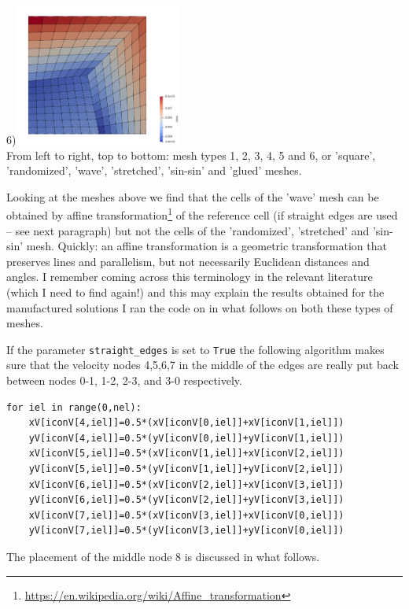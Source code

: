 \begin{center}
{\small 6})\includegraphics[width=5.5cm]{python_codes/fieldstone_76/results/mt6}\\
{\captionfont From left to right, top to bottom: mesh types 1, 2, 3, 4, 5 and 6, 
or 'square', 'randomized', 'wave', 'stretched', 'sin-sin' and 'glued' meshes.}
\end{center}

Looking at the meshes above we find that the cells of the 'wave' mesh 
can be obtained by affine transformation\footnote{\url{https://en.wikipedia.org/wiki/Affine_transformation}} 
of the reference cell (if straight edges are used -- see next paragraph) 
but not the cells of the 'randomized', 'stretched' and 'sin-sin' mesh. 
Quickly: an affine transformation 
is a geometric transformation that preserves lines and parallelism, but not necessarily 
Euclidean distances and angles. 
I remember coming across this terminology in the relevant literature (which I need to find again!)
and this may explain the results obtained for the manufactured solutions I ran the code on 
in what follows on both these types of meshes.

If the parameter \lstinline{straight_edges} is set to \lstinline{True}
the following algorithm makes sure that the velocity nodes 4,5,6,7 in the middle of the edges 
are really put back between nodes 0-1, 1-2, 2-3, and 3-0 respectively. 
\begin{lstlisting}
for iel in range(0,nel):
    xV[iconV[4,iel]]=0.5*(xV[iconV[0,iel]]+xV[iconV[1,iel]])
    yV[iconV[4,iel]]=0.5*(yV[iconV[0,iel]]+yV[iconV[1,iel]])
    xV[iconV[5,iel]]=0.5*(xV[iconV[1,iel]]+xV[iconV[2,iel]])
    yV[iconV[5,iel]]=0.5*(yV[iconV[1,iel]]+yV[iconV[2,iel]])
    xV[iconV[6,iel]]=0.5*(xV[iconV[2,iel]]+xV[iconV[3,iel]])
    yV[iconV[6,iel]]=0.5*(yV[iconV[2,iel]]+yV[iconV[3,iel]])
    xV[iconV[7,iel]]=0.5*(xV[iconV[3,iel]]+xV[iconV[0,iel]])
    yV[iconV[7,iel]]=0.5*(yV[iconV[3,iel]]+yV[iconV[0,iel]])
\end{lstlisting}
The placement of the middle node 8 is discussed in what follows.


